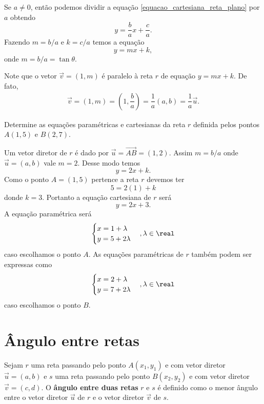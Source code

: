 Se $a \ne 0$, ent\~ao podemos dividir a equa\c{c}\~ao \eqref{equacao_cartesiana_reta_plano} por $a$ obtendo
\[
  y = \dfrac{b}{a}x + \dfrac{c}{a}.
\]
Fazendo $m = b/a$ e $k = c/a$ temos a equa\c{c}\~ao
\[
  y = mx + k,
\]
onde $m = b/a = \tan \theta$.

Note que o vetor $\vec{v} = (1,m)$ \'e paralelo \`a reta $r$ de equa\c{c}\~ao $y = mx + k$. De fato,
\begin{align*}
  \vec{v} = (1,m) = \left(1, \dfrac{b}{a}\right) = \dfrac{1}{a}(a,b) = \dfrac{1}{a}\vec{u}.
\end{align*}

\begin{exemplos}
  Determine as equa\c{c}\~oes param\'etricas e cartesianas da reta $r$ definida pelos pontos $A(1,5)$ e $B(2,7)$.
  \begin{solucao}
    Um vetor diretor de $r$ \'e dado por $\vec{u} = \vec{AB} = (1,2)$. Assim $m = b/a$ onde $\vec{u} = (a,b)$ vale $m = 2$. Desse modo temos
    \[
      y = 2x + k.
    \]
    Como o ponto $A = (1,5)$ pertence a reta $r$ devemos ter
    \[
      5 = 2(1) + k
    \]
    donde $k = 3$. Portanto a equa\c{c}\~ao cartesiana de $r$ ser\'a
    \[
      y = 2x + 3.
    \]
    A equa\c{c}\~ao param\'etrica ser\'a
    \[
      \begin{cases}
        x = 1 + \lambda\\
        y = 5 + 2\lambda
      \end{cases}, \lambda \in \real
    \]
    caso escolhamos o ponto $A$. As equa\c{c}\~oes param\'etricas de $r$ tamb\'em podem ser expressas como
    \[
      \begin{cases}
        x = 2 + \lambda\\
        y = 7 + 2\lambda
      \end{cases}, \lambda \in \real
    \]
    caso escolhamos o ponto $B$.
  \end{solucao}
\end{exemplos}

\section{\^Angulo entre retas} %
\label{sec:angulo_entre_retas}
Sejam $r$ uma reta passando pelo ponto $A(x_1, y_1)$ e com vetor diretor $\vec{u} = (a,b)$ e $s$ uma reta passando pelo ponto $B(x_2, y_2)$ e com vetor diretor $\vec{v} = (c,d)$. O \textbf{\^angulo entre duas retas} $r$ e $s$ \'e definido como o menor \^angulo entre o vetor diretor $\vec{u}$ de $r$ e o vetor diretor $\vec{v}$ de $s$.

